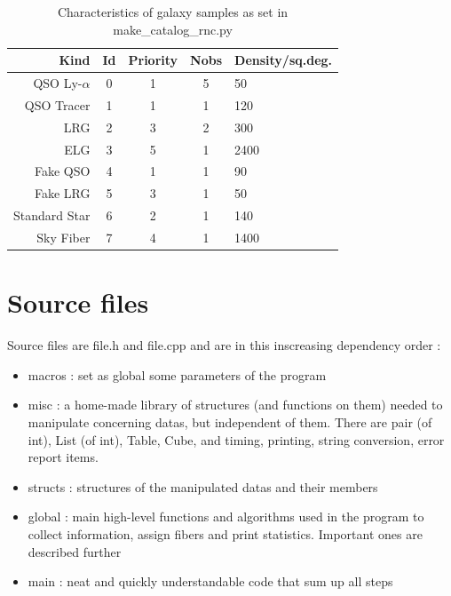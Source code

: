 \documentclass{extarticle}
\begin{document}
\begin{table}[H]\centering
	\begin{tabular}{rcccl} \hline
		Kind&Id&Priority&Nobs&Density/sq.deg.\\ \hline
		QSO Ly-$\alpha$& 0 & 1 & 5 &  50\\
		QSO Tracer & 1 & 1 & 1& 120\\
		LRG & 2 & 3 &2 & 300\\
		ELG & 3 & 5 & 1 & 2400\\
		Fake QSO & 4 & 1 & 1& 90\\
		Fake LRG & 5 & 3 & 1 & 50\\
		Standard Star & 6 & 2 & 1&  140\\
		Sky Fiber & 7 & 4 & 1& 1400\\ \hline
	\end{tabular}
	\caption{Characteristics of galaxy samples as set in make\_catalog\_rnc.py}\label{table:characteristics}
\end{table}


\section{Source files}
Source files are file.h and file.cpp and are in this inscreasing dependency order :
\begin{itemize} 
	\item macros : set as global some parameters of the program
	\item misc : a home-made library of structures (and functions on them) needed to manipulate concerning datas, but independent of them. There are pair (of int), List (of int), Table, Cube, and timing, printing, string conversion, error report items.
	\item structs : structures of the manipulated datas and their members
	\item global : main high-level functions and algorithms used in the program to collect information, assign fibers and print statistics. Important ones are described further
	\item main : neat and quickly understandable code that sum up all steps
\end{itemize} 
\end{document}
